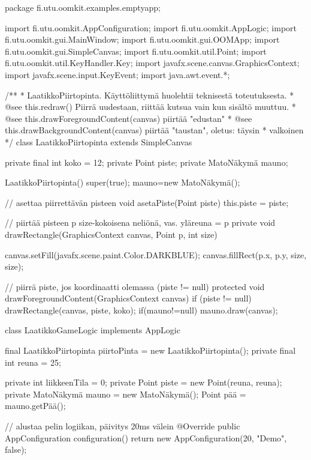 \begin{javacode}
package fi.utu.oomkit.examples.emptyapp;



import fi.utu.oomkit.AppConfiguration;
import fi.utu.oomkit.AppLogic;
import fi.utu.oomkit.gui.MainWindow;
import fi.utu.oomkit.gui.OOMApp;
import fi.utu.oomkit.gui.SimpleCanvas;
import fi.utu.oomkit.util.Point;
import fi.utu.oomkit.util.KeyHandler.Key;
import javafx.scene.canvas.GraphicsContext;
import javafx.scene.input.KeyEvent;
import java.awt.event.*;

/**
 * LaatikkoPiirtopinta. Käyttöliittymä huolehtii teknisestä toteutuksesta.
 * @see this.redraw() Piirrä uudestaan, riittää kutsua vain kun sisältö muuttuu.
 * @see this.drawForegroundContent(canvas) piirtää "edustan"
 * @see this.drawBackgroundContent(canvas) piirtää "taustan", oletus: täysin
 * valkoinen */
class LaatikkoPiirtopinta extends SimpleCanvas {
    private final int koko = 12;
    private Point piste;
    private MatoNäkymä mauno;

    LaatikkoPiirtopinta() { super(true);
    mauno=new MatoNäkymä();}

    // asettaa piirrettävän pisteen
    void asetaPiste(Point piste) {
        this.piste = piste;
    }

    // piirtää pisteen p size-kokoisena neliönä, vas. yläreuna = p
    private void drawRectangle(GraphicsContext canvas, Point p, int size) {
        canvas.setFill(javafx.scene.paint.Color.DARKBLUE);
        canvas.fillRect(p.x, p.y, size, size);
        
        
    }

    // piirrä piste, jos koordinaatti olemassa (piste != null)
    protected void drawForegroundContent(GraphicsContext canvas) {
        if (piste != null) {
        	drawRectangle(canvas, piste, koko);
        	}
        if(mauno!=null) {
        	mauno.draw(canvas);
        }
    }
}

class LaatikkoGameLogic implements AppLogic {
    final LaatikkoPiirtopinta piirtoPinta = new LaatikkoPiirtopinta();
    private final int reuna = 25;

    private int liikkeenTila = 0;
    private Point piste = new Point(reuna, reuna);
    private MatoNäkymä mauno = new MatoNäkymä();
    Point pää = mauno.getPää();
  

    // alustaa pelin logiikan, päivitys 20ms välein
    @Override
    public AppConfiguration configuration() {
        return new AppConfiguration(20, "Demo", false);
    }

}
\end{javacode}
